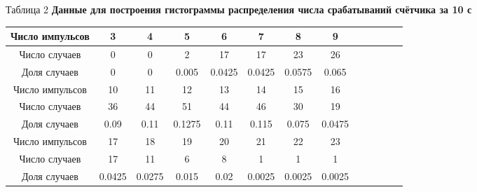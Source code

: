 \documentclass[a4paper, 12pt]{article}
\begin{document}
\begin{enumerate}
\begin{center}
                Таблица 2
                \textbf{Данные для построения гистограммы распределения числа срабатываний счётчика за 10 с}
			\begin{longtable}{|c|c|c|c|c|c|c|c|c|c|c|c|c|}
				\hline
				Число импульсов & 3 & 4 & 5 & 6 & 7 & 8 & 9 \\
				\hline
				Число случаев & 0 & 0 & 2 & 17 & 17 & 23 & 26\\
				\hline
				Доля случаев & 0 & 0 & 0.005 & 0.0425 & 0.0425 & 0.0575 & 0.065\\
				\hline
				\hline
				Число импульсов & 10 & 11 & 12 & 13 & 14 & 15 & 16\\
				\hline
				Число случаев & 36 & 44 & 51 & 44 & 46 & 30 & 19\\
				\hline
				Доля случаев & 0.09 & 0.11 & 0.1275 & 0.11 & 0.115 & 0.075 & 0.0475 \\
				\hline
				\hline
				Число импульсов & 17 & 18 & 19 & 20 & 21 & 22 & 23\\
				\hline
				Число случаев & 17 & 11 & 6 & 8 & 1 & 1 & 1\\ 
				\hline
				Доля случаев & 0.0425 & 0.0275 & 0.015 & 0.02 & 0.0025 & 0.0025 & 0.0025\\
                \hline
			\end{longtable}
		\end{center}
		

\end{enumerate}
\end{document}
